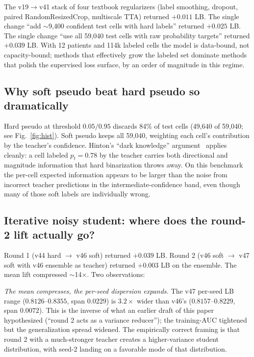 \documentclass[conference]{IEEEtran}
\begin{document}
The v19$\rightarrow$v41 stack of four textbook regularizers (label smoothing, dropout, paired RandomResizedCrop, multiscale TTA) returned $+0.011$ LB. The single change ``add $\sim$9{,}400 confident test cells with hard labels'' returned $+0.025$ LB. The single change ``use all 59{,}040 test cells with raw probability targets'' returned $+0.039$ LB. With 12 patients and 114k labeled cells the model is data-bound, not capacity-bound; methods that effectively grow the labeled set dominate methods that polish the supervised loss surface, by an order of magnitude in this regime.

\subsection{Why soft pseudo beat hard pseudo so dramatically}

Hard pseudo at threshold $0.05/0.95$ discards 84\% of test cells (49{,}640 of 59{,}040; see Fig.~\ref{fig:hist}). Soft pseudo keeps all 59{,}040, weighting each cell's contribution by the teacher's confidence. Hinton's ``dark knowledge'' argument~\cite{hinton2015distilling} applies cleanly: a cell labeled $p_t = 0.78$ by the teacher carries both directional and magnitude information that hard binarization throws away. On this benchmark the per-cell expected information appears to be larger than the noise from incorrect teacher predictions in the intermediate-confidence band, even though many of those soft labels are individually wrong.

\subsection{Iterative noisy student: where does the round-2 lift actually go?}

Round 1 (v44 hard $\rightarrow$ v46 soft) returned $+0.039$ LB. Round 2 (v46 soft $\rightarrow$ v47 soft with v46 ensemble as teacher) returned $+0.003$ LB on the ensemble. The mean lift compressed $\sim$14$\times$. Two observations:

\emph{The mean compresses, the per-seed dispersion expands.} The v47 per-seed LB range ($0.8126$--$0.8355$, span $0.0229$) is $3.2\times$ wider than v46's ($0.8157$--$0.8229$, span $0.0072$). This is the inverse of what an earlier draft of this paper hypothesized (``round 2 acts as a variance reducer''); the training-AUC tightened but the generalization spread widened. The empirically correct framing is that round 2 with a much-stronger teacher creates a higher-variance student distribution, with seed-2 landing on a favorable mode of that distribution.
\end{document}
